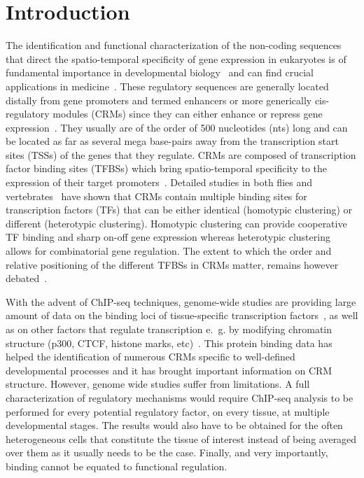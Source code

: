 \documentclass[a4,center,fleqn]{NAR}
\begin{document}
\section{Introduction}

The identification and functional characterization of the non-coding sequences
that direct the spatio-temporal specificity of gene expression in eukaryotes is
of fundamental importance in developmental biology~\cite{Davidson:2006kx} and
can find crucial applications in medicine~\cite{Dorer:2009wd}.
These regulatory sequences are generally located distally from gene promoters
and termed enhancers or more generically cis-regulatory modules (CRMs) since
they can either enhance or repress gene expression~\cite{pmid22705667}.
They usually are of the order of 500 nucleotides (nts) long and can be located
as far as several mega base-pairs away from the transcription start sites
(TSSs) of the genes that they regulate.
CRMs are composed of transcription factor binding sites (TFBSs) which bring
spatio-temporal specificity to the expression of their target
promoters~\cite{lellimann13arg}. 
Detailed studies in both flies and vertebrates~\cite{levine10cb} have shown
that CRMs contain multiple binding sites for transcription factors (TFs) that
can be either identical (homotypic clustering) or different (heterotypic
clustering).
Homotypic clustering can provide cooperative TF binding and sharp on-off gene
expression whereas heterotypic clustering allows for combinatorial gene
regulation.
The extent to which the order and relative positioning of the different TFBSs
in CRMs matter, remains however debated~\cite{Arnosti:2005uq,Swanson:2010ai}.

With the advent of ChIP-seq techniques, genome-wide studies are providing large
amount of data on the binding loci of tissue-specific transcription
factors~\cite{Johnson:2007fk}, as well as on other factors that regulate
transcription e.~g. by modifying chromatin structure (p300, CTCF, histone
marks, etc)~\cite{Barski:2007uq,Mikkelsen:2007kx}.
This protein binding data has helped 
the identification of numerous CRMs specific to well-defined
developmental processes and it has brought important information  on CRM
structure.
However, genome wide studies suffer from  limitations.
A full characterization of regulatory mechanisms would require ChIP-seq
analysis to be performed for every potential regulatory factor, on every
tissue, at multiple developmental stages.
The results would also have to be obtained for the often heterogeneous cells
that constitute the tissue of interest instead of being averaged over them as
it usually needs to be the case. 
Finally, and very importantly, binding cannot be equated to functional
regulation.
\end{document}
